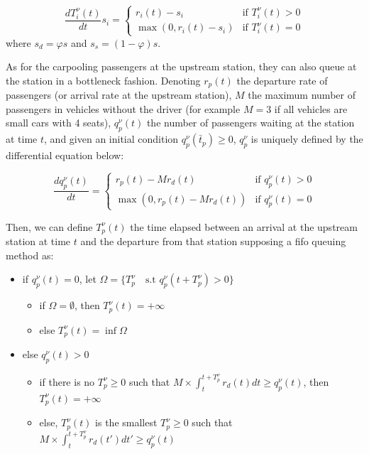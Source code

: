 \documentclass[english, a4paper]{article}
\theoremstyle{plain}
\theoremstyle{definition}
\theoremstyle{remark}
\begin{document}
\begin{equation}
    \frac{d T^{\nu}_i(t)}{dt} s_i = \left\{
    \begin{array}{lr}
        r_i (t) - s_i & \text{if } T^{\nu}_i(t) > 0\\
        \max (0, r_i (t) - s_i) & \text{if } T^{\nu}_i(t) = 0
    \end{array}
    \right.
\end{equation}
where $s_d = \varphi s$ and $s_s = (1-\varphi)s$.

As for the carpooling passengers at the upstream station, they can also queue at the station in a bottleneck fashion. Denoting $r_p(t)$ the departure rate of passengers (or arrival rate at the upstream station), $M$ the maximum number of passengers in vehicles without the driver (for example $M=3$ if all vehicles are small cars with 4 seats), $q^{\nu}_p(t)$ the number of passengers waiting at the station at time $t$, and given an initial condition $q^{\nu}_p(\bar{t}_p) \geq 0$, $q^{\nu}_p$ is uniquely defined by the differential equation below:

\begin{equation}
    \label{equation:passengers_queue_at_station}
    \frac{d q^{\nu}_p(t)}{dt} = \left\{
    \begin{array}{lr}
        r_p (t) - M r_d (t) & \text{if } q^{\nu}_p(t) > 0\\
        \max (0, r_p (t) - M r_d (t)) & \text{if } q^{\nu}_p(t) = 0
    \end{array}
    \right.
\end{equation}

Then, we can define $T^{\nu}_p(t)$ the time elapsed between an arrival at the upstream station at time $t$ and the departure from that station supposing a \acrfull{fifo} queuing method as:

\begin{itemize}
    \item if $q_p^{\nu}(t) = 0$, let $\Omega = \{T_p^\nu \quad \text{s.t } q_p^\nu(t + T_p^\nu) > 0\}$
    \begin{itemize}
        \item if $\Omega = \emptyset$, then $T^{\nu}_p(t) = +\infty$
        \item else $T^{\nu}_p(t) = \inf \Omega$
    \end{itemize}
    \item else $q_p^{\nu}(t) > 0$
    \begin{itemize}
        \item if there is no $T^{\nu}_p \geq 0$ such that $M \times \int_{t}^{t+T^{\nu}_p} r_d(t) dt \geq q_p^{\nu}(t)$, then $T^{\nu}_p(t) = +\infty$
        \item else, $T^{\nu}_p(t)$ is the smallest $T^{\nu}_p \geq 0$ such that $M \times \int_{t}^{t + T^{\nu}_p} r_d(t') dt' \geq q_p^{\nu}(t)$
    \end{itemize}
\end{itemize}
\end{document}

